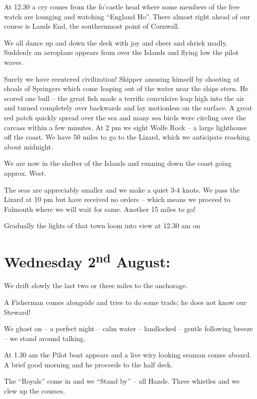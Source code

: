 \documentclass[
  11pt,
  msmallroyalvopaper
]{memoir}
\begin{document}
At 12.30 a cry comes from the fo'castle head where some members of the
free watch are lounging and watching ``England Ho''. There almost right
ahead of our course is Lands End, the southernmost point of Cornwall.

We all dance up and down the deck with joy and cheer and shriek madly.
Suddenly an aeroplane appears from over the Islands and flying low the
pilot waves.

Surely we have reentered civilization! Skipper amusing himself by
shooting at shoals of Springers which come leaping out of the water near
the ships stern. He scored one bull -- the great fish made a terrific
convulsive leap high into the air and turned completely over backwards
and lay motionless on the surface. A great red patch quickly spread over
the sea and many sea birds were circling over the carcass within a few
minutes. At 2 pm we sight Wolfe Rock -- a large lighthouse off the
coast. We have 50 miles to go to the Lizard, which we anticipate
reaching about midnight.

We are now in the shelter of the Islands and running down the coast
going approx. West.

The seas are appreciably smaller and we make a quiet 3-4 knots. We pass
the Lizard at 10 pm but have received no orders -- which means we
proceed to Falmouth where we will wait for same. Another 15 miles to go!

Gradually the lights of that town loom into view at 12.30 am on

\hypertarget{wednesday-2nd-august}{%
\section{\texorpdfstring{Wednesday 2\textsuperscript{nd}
August:}{Wednesday 2nd August:}}\label{wednesday-2nd-august}}

We drift slowly the last two or three miles to the anchorage.

A Fisherman comes alongside and tries to do some trade; he does not know
our Steward!

We ghost on -- a perfect night -- calm water -- landlocked -- gentle
following breeze -- we stand around talking.

At 1.30 am the Pilot boat appears and a live wiry looking seaman comes
aboard. A brief good morning and he proceeds to the half deck.

The ``Royals'' come in and we ``Stand by'' -- all Hands. Three whistles
and we clew up the courses.
\end{document}
